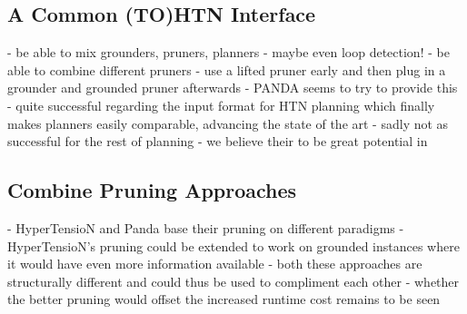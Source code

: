 \subsection{A Common (TO)HTN Interface}
- be able to mix grounders, pruners, planners - maybe even loop detection!
- be able to combine different pruners - use a lifted pruner early and then plug in a grounder and grounded pruner afterwards
- PANDA seems to try to provide this
	- quite successful regarding the input format for HTN planning which finally makes planners easily comparable, advancing the state of the art
	- sadly not as successful for the rest of planning
- we believe their to be great potential in 

\subsection{Combine Pruning Approaches}
- HyperTensioN and Panda base their pruning on different paradigms
- HyperTensioN's pruning could be extended to work on grounded instances where it would have even more information available
- both these approaches are structurally different and could thus be used to compliment each other
- whether the better pruning would offset the increased runtime cost remains to be seen

